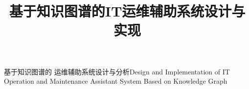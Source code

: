 \studentid{\quad }   %
\title{基于知识图谱的IT运维辅助系统设计与实现}{基于知识图谱的  运维辅助系统设计与分析}{}{}{Design and Implementation of IT Operation and Maintenance Assistant System Based on Knowledge Graph}{}
\author{\quad }{\quad }
\authorizedate{\quad }
\committeechair{\quad }
\reviewer{\quad }{\quad }


\makecover
\cleardoublepage


